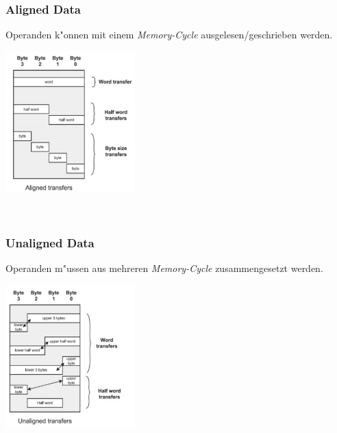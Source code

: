     \begin{minipage}{9cm}
    	\subsubsection{Aligned Data}
    	Operanden k"onnen mit einem \textit{Memory-Cycle} ausgelesen/geschrieben werden.
    	
    	\includegraphics[width=5cm]{images/alignedData}
    \end{minipage}
    \begin{minipage}{0.5cm}
    	\-\
    \end{minipage}
    \begin{minipage}{9cm}
    	\subsubsection{Unaligned Data}
    	Operanden m"ussen aus mehreren \textit{Memory-Cycle} zusammengesetzt werden.
    	
    	\includegraphics[width=5cm]{images/unalignedData}
    \end{minipage}
    
